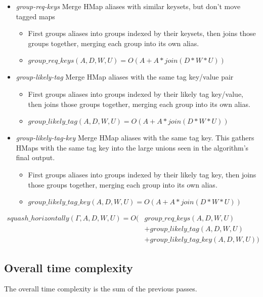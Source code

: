 \begin{itemize}
	\item \emph{group-req-keys} Merge HMap aliases with similar keysets, but
		don't move tagged maps
		\begin{itemize}
			\item First groups aliases into groups indexed by their keysets, then
					joins those groups together, merging each group into its own alias.
			\item $group\_req\_keys(A,D,W,U) = O(A + A*join(D*W*U))$
		\end{itemize}
	\item \emph{group-likely-tag} Merge HMap aliases with the same tag key/value pair
		\begin{itemize}
			\item First groups aliases into groups indexed by their likely tag key/value, then
					joins those groups together, merging each group into its own alias.
			\item $group\_likely\_tag(A,D,W,U) = O(A + A*join(D*W*U))$
		\end{itemize}
	\item \emph{group-likely-tag-key} Merge HMap aliases with the same tag key.
			  This gathers HMaps with the same tag key into the large unions seen in the algorithm's
				final output.
		\begin{itemize}
			\item First groups aliases into groups indexed by their likely tag key, then
					joins those groups together, merging each group into its own alias.
			\item $group\_likely\_tag\_key(A,D,W,U) = O(A + A*join(D*W*U))$
		\end{itemize}
\end{itemize}

\begin{align*}
squash\_horizontally(\Gamma, A, D, W, U) = O(&group\_req\_keys(A,D,W,U)\\
								  													 &+ group\_likely\_tag(A,D,W,U) \\
								  												   &+ group\_likely\_tag\_key(A,D,W,U))
\end{align*}

\subsection{Overall time complexity}
\label{overall-time-complexity}
The overall time complexity is the sum of the previous passes.

